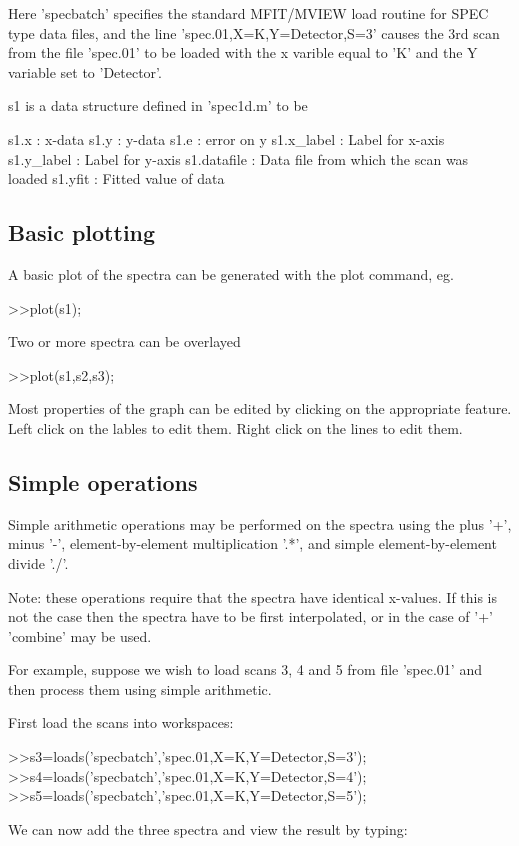 \documentclass[a4paper]{article}
\begin{document}
Here 'specbatch' specifies the standard
MFIT/MVIEW load routine for SPEC type data files, and
the line 'spec.01,X=K,Y=Detector,S=3' causes the
3rd scan from the file 'spec.01' to be loaded with 
the x varible equal to 'K' and the Y variable set to
'Detector'.

s1 is a data structure defined in 'spec1d.m' to be

s1.x		:  x-data
s1.y		:  y-data
s1.e		:  error on y
s1.x_label	: Label for x-axis
s1.y_label	: Label for y-axis
s1.datafile	: Data file from which the scan was loaded
s1.yfit         : Fitted value of data

\subsection{Basic plotting}

A basic plot of the spectra can be generated with the
plot command, eg.

>>plot(s1);

Two or more spectra can be overlayed

>>plot(s1,s2,s3);

Most properties of the graph can be edited by clicking on the 
appropriate feature. Left click on the lables to edit them.
Right click on the lines to edit them.

\subsection{Simple operations}

Simple arithmetic operations may be performed on the 
spectra using the plus '+', minus '-', element-by-element
multiplication '.*', and simple element-by-element divide
'./'. 

Note: these operations require that the spectra have 
identical x-values. If this is not the case then the
spectra have to be first interpolated, or in the case of
'+' 'combine' may be used.

For example, suppose we wish to load scans 3, 4 and 5 from
file 'spec.01' and then process them using simple 
arithmetic.

First load the scans into workspaces:

>>s3=loads('specbatch','spec.01,X=K,Y=Detector,S=3');
>>s4=loads('specbatch','spec.01,X=K,Y=Detector,S=4');
>>s5=loads('specbatch','spec.01,X=K,Y=Detector,S=5');

We can now add the three spectra and view the result 
by typing:
\end{document}

